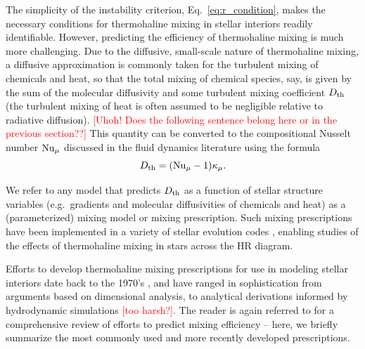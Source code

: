 The simplicity of the instability criterion, Eq.~\eqref{eq:r_condition}, makes the necessary conditions for thermohaline mixing in stellar interiors readily identifiable. 
However, predicting the efficiency of thermohaline mixing is much more challenging. 
Due to the diffusive, small-scale nature of thermohaline mixing, a diffusive approximation is commonly taken for the turbulent mixing of chemicals and heat, so that the total mixing of chemical species, say, is given by the sum of the molecular diffusivity and some turbulent mixing coefficient $D_\mathrm{th}$ (the turbulent mixing of heat is often assumed to be negligible relative to radiative diffusion). \textcolor{red}{[Uhoh! Does the following sentence belong here or in the previous section??]}
This quantity can be converted to the compositional Nusselt number $\mathrm{Nu}_\mu$ discussed in the fluid dynamics literature using the formula
\begin{equation} \label{eq:Dth_from_Nu}
    \Dth = (\Numu - 1)\kappa_\mu.
\end{equation}

We refer to any model that predicts $D_\mathrm{th}$ as a function of stellar structure variables (e.g.~gradients and molecular diffusivities of chemicals and heat) as a (parameterized) mixing model or mixing prescription. 
Such mixing prescriptions have been implemented in a variety of stellar evolution codes \citep[see][and references therein]{lattanzio_etal_2015}, enabling studies of the effects of thermohaline mixing in stars across the HR diagram.

Efforts to develop thermohaline mixing prescriptions for use in modeling stellar interiors date back to the 1970's \citep{ulrich_1972}, and have ranged in sophistication from arguments based on dimensional analysis, to analytical derivations informed by hydrodynamic simulations \textcolor{red}{[too harsh?]}. 
The reader is again referred to \citet{garaud_DDC_review_2018} for a comprehensive review of efforts to predict mixing efficiency -- here, we briefly summarize the most commonly used and more recently developed prescriptions.


